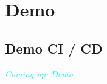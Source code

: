 \section{Demo}
\subsection{Demo CI / CD}

\begin{frame}
	\begin{center}
		\Huge \textcolor{cyan}{\emph{Coming up: Demo}}
	\end{center}
\end{frame}